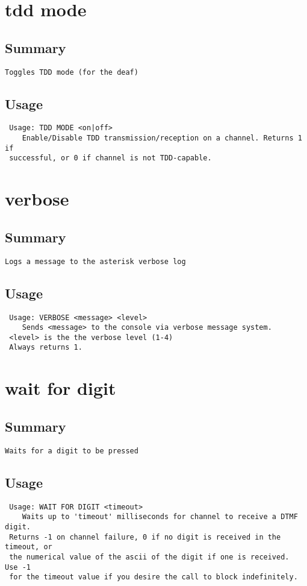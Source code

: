 \section{tdd mode}
\subsection{Summary}
\begin{verbatim}
Toggles TDD mode (for the deaf)
\end{verbatim}
\subsection{Usage}
\begin{verbatim}
 Usage: TDD MODE <on|off>
	Enable/Disable TDD transmission/reception on a channel. Returns 1 if
 successful, or 0 if channel is not TDD-capable.

\end{verbatim}


\section{verbose}
\subsection{Summary}
\begin{verbatim}
Logs a message to the asterisk verbose log
\end{verbatim}
\subsection{Usage}
\begin{verbatim}
 Usage: VERBOSE <message> <level>
	Sends <message> to the console via verbose message system.
 <level> is the the verbose level (1-4)
 Always returns 1.

\end{verbatim}


\section{wait for digit}
\subsection{Summary}
\begin{verbatim}
Waits for a digit to be pressed
\end{verbatim}
\subsection{Usage}
\begin{verbatim}
 Usage: WAIT FOR DIGIT <timeout>
	Waits up to 'timeout' milliseconds for channel to receive a DTMF digit.
 Returns -1 on channel failure, 0 if no digit is received in the timeout, or
 the numerical value of the ascii of the digit if one is received.  Use -1
 for the timeout value if you desire the call to block indefinitely.

\end{verbatim}


